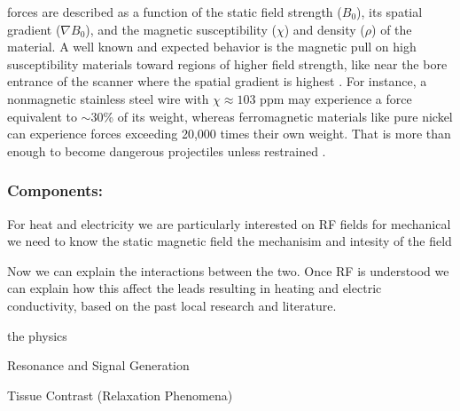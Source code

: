 

forces are described as a function of the static field strength ($B_0$), its spatial gradient ($\nabla B_0$), and the magnetic susceptibility ($\chi$) and density ($\rho$) of the material. A well known and expected behavior is the magnetic pull on high susceptibility materials toward regions of higher field strength, like near the bore entrance of the scanner where the spatial gradient is highest \cite{aboyewa2021,bushberg2011,panych2018}. For instance, a nonmagnetic stainless steel wire with $\chi \approx 103$ ppm may experience a force equivalent to $\sim$30\% of its weight, whereas ferromagnetic materials like pure nickel can experience forces exceeding 20,000 times their own weight. That is more than enough to become dangerous projectiles unless restrained \cite{aboyewa2021,panych2018}.

\subsubsection{Components:}


For heat and electricity we are particularly interested on RF fields
for mechanical we need to know the static magnetic field
the mechanisim and intesity of the field

Now we can explain the interactions between the two. Once RF is understood we can explain how this affect the leads resulting in heating and electric conductivity, based on the past local research and literature.			



the physics

Resonance and Signal Generation


Tissue Contrast (Relaxation Phenomena)

